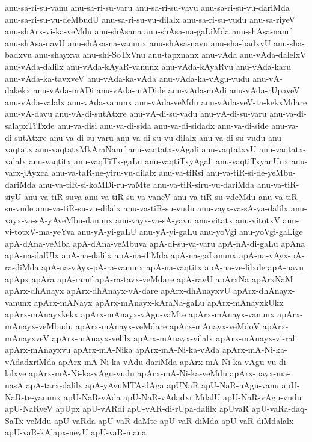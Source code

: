 {anu-sa-ri-su-vanu
anu-sa-ri-su-varu
anu-sa-ri-su-vavu
anu-sa-ri-su-vu-dariMda
anu-sa-ri-su-vu-deMbudU
anu-sa-ri-su-vu-dilalx
anu-sa-ri-su-vudu
anu-sa-riyeV
anu-shArx-vi-ka-veMdu
anu-shAsana
anu-shAsa-na-gaLiMda
anu-shAsa-namf
anu-shAsa-navU
anu-shAsa-na-vanunx
anu-shAsa-navu
anu-sha-badxvU
anu-sha-badxvu
anu-shayxva
anu-shi-SoTxVnu
anu-tapxnanx
anu-vAda
anu-vAda-dalelxV
anu-vAda-dalilx
anu-vAda-kAyaR-vanunx
anu-vAda-kAyaRvu
anu-vAda-karu
anu-vAda-ka-tavxveV
anu-vAda-ka-vAda
anu-vAda-ka-vAgu-vudu
anu-vA-dakekx
anu-vAda-mADi
anu-vAda-mADide
anu-vAda-mAdi
anu-vAda-rUpaveV
anu-vAda-valalx
anu-vAda-vanunx
anu-vAda-veMdu
anu-vAda-veV-ta-kekxMdare
anu-vA-davu
anu-vA-di-sutAtxre
anu-vA-di-su-vadu
anu-vA-di-su-varu
anu-va-di-salapxTiTxde
anu-va-disi
anu-va-di-sida
anu-va-di-sidadx
anu-va-di-side
anu-va-di-sutAtxre
anu-va-di-su-varu
anu-va-di-su-vu-dilalx
anu-va-di-su-vudu
anu-vaqtatx
anu-vaqtatxMkAraNamf
anu-vaqtatx-vAgali
anu-vaqtatxvU
anu-vaqtatx-valalx
anu-vaqtitx
anu-vaqTiTx-gaLu
anu-vaqtiTxyAgali
anu-vaqtiTxyanUnx
anu-varx-jAyxca
anu-va-taR-ne-yiru-vu-dilalx
anu-va-tiRsi
anu-va-tiR-si-de-yeMbu-dariMda
anu-va-tiR-si-koMDi-ru-vaMte
anu-va-tiR-siru-vu-dariMda
anu-va-tiR-siyU
anu-va-tiR-suva
anu-va-tiR-su-va-vaneV
anu-va-tiR-su-vdeMdu
anu-va-tiR-su-vude
anu-va-tiR-su-vu-dilalx
anu-va-tiR-su-vudu
anu-vayx-va-sA-ya-dalilx
anu-vayx-va-sA-yAveMbu-danunx
anu-vayx-va-sA-yavu
anu-vitatx
anu-vitotxV
anu-vi-totxV-ma-yeYva
anu-yA-yi-gaLU
anu-yA-yi-gaLu
anu-yoVgi
anu-yoVgi-gaLige
apA-dAna-veMba
apA-dAna-veMbuva
apA-di-su-va-varu
apA-nA-di-gaLu
apAna
apA-na-dalUlx
apA-na-dalilx
apA-na-diMda
apA-na-gaLanunx
apA-na-vAyx-pA-ra-diMda
apA-na-vAyx-pA-ra-vanunx
apA-na-vaqtitx
apA-na-ve-lilxde
apA-navu
apApx
apAra
apA-ramf
apA-ra-tavx-veMdare
apA-ravU
apArxNa
apArxNaM
apArx-dhAnayx
apArx-dhAnayx-vA-dare
apArx-dhAnayxvU
apArx-dhAnayx-vanunx
apArx-mANayx
apArx-mAnayx-kAraNa-gaLu
apArx-mAnayxkUkx
apArx-mAnayxkekx
apArx-mAnayx-vAgu-vaMte
apArx-mAnayx-vanunx
apArx-mAnayx-veMbudu
apArx-mAnayx-veMdare
apArx-mAnayx-veMdoV
apArx-mAnayxveV
apArx-mAnayx-velilx
apArx-mAnayx-vilalx
apArx-mAnayx-vi-rali
apArx-mAnayxvu
apArx-mA-Nika
apArx-mA-Ni-ka-vAda
apArx-mA-Ni-ka-vAdadxriMda
apArx-mA-Ni-ka-vAdu-dariMda
apArx-mA-Ni-ka-vAgu-vu-di-lalxve
apArx-mA-Ni-ka-vAgu-vudu
apArx-mA-Ni-ka-veMdu
apArx-payx-ma-nasA
apA-tarx-dalilx
apA-yAvuMTA-dAga
apUNaR
apU-NaR-nAgu-vanu
apU-NaR-te-yanunx
apU-NaR-vAda
apU-NaR-vAdadxriMdalU
apU-NaR-vAgu-vudu
apU-NaRveV
apUpx
apU-vARdi
apU-vAR-di-rUpa-dalilx
apUvaR
apU-vaRa-daq-SaTx-veMdu
apU-vaRda
apU-vaR-daMte
apU-vaR-diMda
apU-vaR-diMdalalx
apU-vaR-kAlapx-neyU
apU-vaR-mana
}

